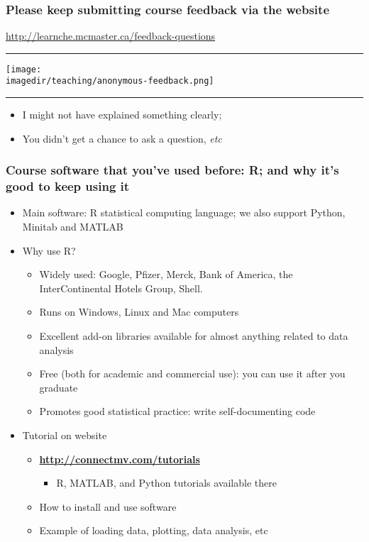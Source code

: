 \begin{frame}\frametitle{Please keep submitting course feedback via the website}
	
	\href{http://learnche.mcmaster.ca/feedback-questions}{http://learnche.mcmaster.ca/feedback-questions}
	\vspace{4pt}
	\hrule
	\begin{center}
		\texttt{[image: \\imagedir/teaching/anonymous-feedback.png]}
	\end{center}
	\hrule
	\begin{itemize}
		\item	I might not have explained something clearly;
		\item	You didn't get a chance to ask a question, \emph{etc}
	\end{itemize}
	
\end{frame}

\begin{frame}\frametitle{Course software that you've used before: R; and why it's good to keep using it}
	\begin{itemize}
		\item	Main software: R statistical computing language; we also support Python, Minitab and MATLAB
	\end{itemize}
	\begin{itemize}
		\item	Why use R?
		\begin{itemize}
			\item	Widely used: Google, Pfizer, Merck, Bank of America, the InterContinental Hotels Group, Shell.
			\item	Runs on Windows, Linux and Mac computers
			\item	Excellent add-on libraries available for almost anything related to data analysis
			\item	Free (both for academic and commercial use): you can use it after you graduate
			\item	Promotes good statistical practice: write self-documenting code
		\end{itemize}
	\end{itemize}
	\begin{itemize}
		\item	Tutorial on website
		\begin{itemize}
			\item	\textbf{\href{http://connectmv.com/tutorials}{http://connectmv.com/tutorials}}
			\begin{itemize}
				\item	R, MATLAB, and Python tutorials available there
			\end{itemize}
			\item	How to install and use software
			\item	Example of loading data, plotting, data analysis, etc
		\end{itemize}
	\end{itemize}
\end{frame}

